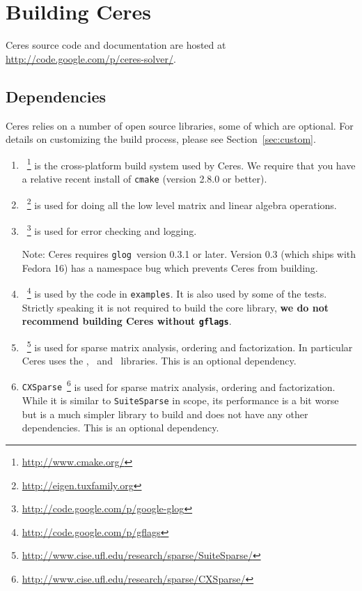 \chapter{Building Ceres}
\label{chapter:build}
Ceres source code and documentation are hosted at
\url{http://code.google.com/p/ceres-solver/}.

\section{Dependencies}
Ceres relies on a number of open source libraries, some of which are optional. For details on customizing the build process, please see Section~\ref{sec:custom}.

\begin{enumerate}
\item{\cmake~\footnote{\url{http://www.cmake.org/}}} is the cross-platform build system used by Ceres. We require that you have a relative recent install of \texttt{cmake} (version 2.8.0 or better).
\item{\eigen~\footnote{\url{http://eigen.tuxfamily.org}}} is used for doing all the low level matrix and
  linear algebra operations.

\item{\glog~\footnote{\url{http://code.google.com/p/google-glog}}} is used for error checking and logging.

 Note: Ceres requires \texttt{glog}\ version 0.3.1 or later. Version 0.3 (which ships with Fedora 16) has a namespace bug which prevents Ceres from building.

\item{\gflags~\footnote{\url{http://code.google.com/p/gflags}}} is used by the code in
  \texttt{examples}. It is also used by some of the tests. Strictly speaking it is not required to build the core library, \textbf{ we do not recommend building Ceres without \texttt{gflags}}.

\item{\suitesparse~\footnote{\url{http://www.cise.ufl.edu/research/sparse/SuiteSparse/}}} is used for sparse matrix analysis,
  ordering and factorization. In particular Ceres uses the
  \amd, \colamd\ and \cholmod\ libraries. This is an optional
  dependency.

\item{\texttt{CXSparse}~\footnote{\url{http://www.cise.ufl.edu/research/sparse/CXSparse/}}} is used for sparse matrix analysis, ordering and factorization. While it is similar to \texttt{SuiteSparse} in scope, its performance is a bit worse but is a much simpler library to build and does not have any other dependencies. This is an optional dependency.


\end{enumerate}
